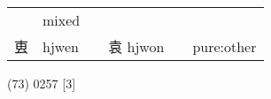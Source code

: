 \documentclass[14pt,a4paper]{scrartcl}
\begin{document}
\begin{longtable}[c]{@{}llllll@{}}
\begin{minipage}[t]{0.14\columnwidth}
\strut\end{minipage} &
\begin{minipage}[t]{0.14\columnwidth}\raggedright\strut
mixed
\strut\end{minipage}\tabularnewline
\begin{minipage}[t]{0.14\columnwidth}\raggedright\strut
叀
\strut\end{minipage} &
\begin{minipage}[t]{0.14\columnwidth}\raggedright\strut
hjwen
\strut\end{minipage} &
\begin{minipage}[t]{0.14\columnwidth}\raggedright\strut
\strut\end{minipage} &
\begin{minipage}[t]{0.14\columnwidth}\raggedright\strut
袁 hjwon
\strut\end{minipage} &
\begin{minipage}[t]{0.14\columnwidth}\raggedright\strut
\strut\end{minipage} &
\begin{minipage}[t]{0.14\columnwidth}\raggedright\strut
pure:other
\strut\end{minipage}\tabularnewline
\bottomrule
\end{longtable}

(73) 0257 {[}3{]}
\end{document}
